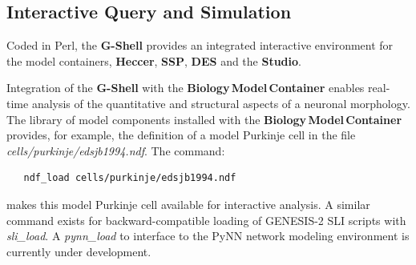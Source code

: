 \documentclass{article}
\begin{document}
\subsection{Interactive Query and Simulation}

Coded in Perl, the {\bf G-Shell} provides an integrated interactive
environment for the model containers, {\bf Heccer}, {\bf SSP},
{\bf DES} and the {\bf Studio}.





Integration of the {\bf G-Shell} with the {\bf Biology\,Model\,Container} enables
real-time analysis of the quantitative and structural aspects of a
neuronal morphology.  The library of model components
installed with the {\bf Biology\,Model\,Container} provides, for example, the definition of a
model Purkinje cell in the file {\it cells/purkinje/edsjb1994.ndf}.
The command:
\begin{verbatim}
   ndf_load cells/purkinje/edsjb1994.ndf
\end{verbatim}
makes this model Purkinje cell available for interactive analysis.
A similar command exists for backward-compatible
loading of GENESIS-2 SLI scripts with {\it sli\_load}.  A {\it
  pynn\_load} to interface to
the PyNN network modeling environment \cite{davison08:_pynn} is currently under development.

\end{document}
